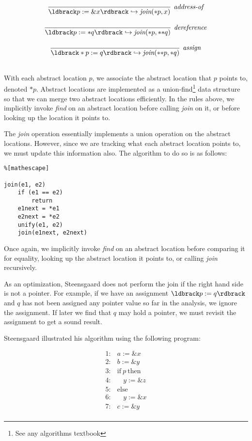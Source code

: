 \documentclass[11pt]{article}
\newcommand{\parg}[1] %
  {\ldbrack #1 \rdbrack}
\begin{document}
\begin{sloppypar}
\[\begin{array}{c}
\infer[\textit{address-of}]
	{\parg{p := \&x} \hookrightarrow \textit{join}(*p,x)}
	{}\\[3ex]
	
\infer[\textit{dereference}]
	{\parg{p := *q} \hookrightarrow \textit{join}(*p,*{*}q)}
	{}\\[3ex]
	
\infer[\textit{assign}]
	{\parg{*p := q} \hookrightarrow \textit{join}(*{*}p,*q)}
	{}\\[3ex]
	
\end{array}
\]

With each abstract location $p$, we associate the abstract location that $p$ points to, denoted $*p$.  Abstract locations are implemented as a union-find\footnote{See any algorithms textbook} data structure so that we can merge two abstract locations efficiently.  In the rules above, we implicitly invoke \textit{find} on an abstract location before calling \textit{join} on it, or before looking up the location it points to.

The \textit{join} operation essentially implements a union operation on the abstract locations.  However, since we are tracking what each abstract location points to, we must update this information also.  The algorithm to do so is as follows:


\begin{lstlisting}%[mathescape]

join(e1, e2)
    if (e1 == e2)
        return
    e1next = *e1
    e2next = *e2
    unify(e1, e2)
    join(e1next, e2next)

\end{lstlisting}


Once again, we implicitly invoke \textit{find} on an abstract location before comparing it for equality, looking up the abstract location it points to, or calling \textit{join} recursively.

As an optimization, Steensgaard does not perform the join if the right hand side is not a pointer.  For example, if we have an assignment $\parg{p := q}$ and $q$ has not been assigned any pointer value so far in the analysis, we ignore the assignment.  If later we find that $q$ may hold a pointer, we must revisit the assignment to get a sound result.

Steensgaard illustrated his algorithm using the following program:

\[
\begin{array}{ll}
1: & a := \&x\\
2: & b := \&y\\
3: & \mbox{if}~ p ~\mbox{then}\\
4: & ~~~~ y := \&z\\
5: & \mbox{else}\\
6: & ~~~~ y := \&x\\
7: & c := \&y\\
\end{array}
\]


\end{sloppypar}
\end{document}
